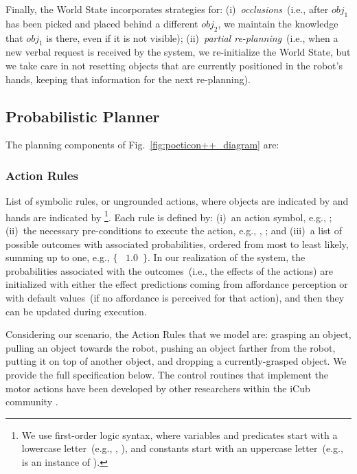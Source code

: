 Finally, the World State incorporates strategies for:
(i)~\emph{occlusions}~(i.e., after $obj_1$ has been picked and placed behind a different $obj_2$, we maintain the knowledge that $obj_1$ is there, even if it is not visible);
(ii)~{\emph{partial re-planning}}~(i.e., when a new verbal request is received by the system, we re-initialize the World State, but we take care in not resetting objects that are currently positioned in the robot's hands, keeping that information for the next re-planning).

\subsection{Probabilistic Planner}
\label{sec:poeticon++:proposed_approach:planner}

The planning components of Fig.~\ref{fig:poeticon++_diagram} are:

\subsubsection{Action Rules}
\label{sec:poeticon++:proposed_approach:action_rules}

List of symbolic rules, or ungrounded actions, where objects are indicated by  and hands are indicated by \footnote{%
We use first-order logic syntax, where variables and predicates start with a lowercase letter~(e.g., , ), and constants start with an uppercase letter~(e.g.,  is an instance of ).%
}. %
Each rule is defined by:
(i)~an action symbol, e.g., ;
(ii)~the necessary pre-conditions to execute the action, e.g., , ; and
(iii)~a list of possible outcomes with associated probabilities, ordered from most to least likely, summing up to one, e.g., $\{$ ~$1.0$~$\}$.
In our realization of the system, the probabilities associated with the outcomes~(i.e., the effects of the actions) are initialized with either the effect predictions coming from affordance perception or with default values~(if no affordance is perceived for that action), and then they can be updated during execution.

Considering our scenario, the Action Rules that we model are: grasping an object, pulling an object towards the robot, pushing an object farther from the robot, putting it on top of another object, and dropping a currently-grasped object.
We provide the full specification below.
The control routines that implement the motor actions have been developed by other researchers within the iCub community \cite{pattacini:2010:iros,tikhanoff:2013:humanoids}.

